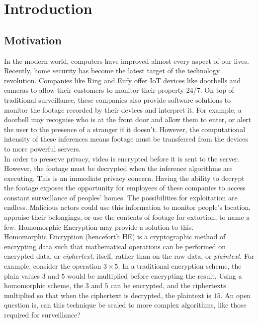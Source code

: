 \chapter{Introduction}
\label{chap:introduction}

\section{Motivation}
\label{sec:motivation}
\setlength{\leftskip}{0.5cm}
\indent \indent
In the modern world, computers have improved almost every aspect of our lives. Recently, home security has become the latest target of the technology revolution. Companies like Ring \cite{RING} and Eufy \cite{EUFY} offer IoT devices like doorbells and cameras to allow their customers to monitor their property 24/7. On top of traditional surveillance, these companies also provide software solutions to monitor the footage recorded by their devices and interpret it. For example, a doorbell may recognise who is at the front door and allow them to enter, or alert the user to the presence of a stranger if it doesn't. However, the computational intensity of these inferences means footage must be transferred from the devices to more powerful servers.
\smallskip \\ \indent
In order to preserve privacy, video is encrypted before it is sent to the server. However, the footage must be decrypted when the inference algorithms are executing. This is an immediate privacy concern. Having the ability to decrypt the footage exposes the opportunity for employees of these companies to access constant surveillance of peoples' homes. The possibilities for exploitation are endless. Malicious actors could use this information to monitor people's location, appraise their belongings, or use the contents of footage for extortion, to name a few. Homomorphic Encryption may provide a solution to this.
\smallskip \\ \indent
Homomorphic Encryption (henceforth HE) is a cryptographic method of encrypting data such that mathematical operations can be performed on encrypted data, or \textit{ciphertext}, itself, rather than on the raw data, or \textit{plaintext}. For example, consider the operation $3 \times 5$. In a traditional encryption scheme, the plain values $3$ and $5$ would be multiplied before encrypting the result. Using a homomorphic scheme, the $3$ and $5$ can be encrypted, and the ciphertexts multiplied so that when the ciphertext is decrypted, the plaintext is $15$. An open question is, can this technique be scaled to more complex algorithms, like those required for surveillance?
